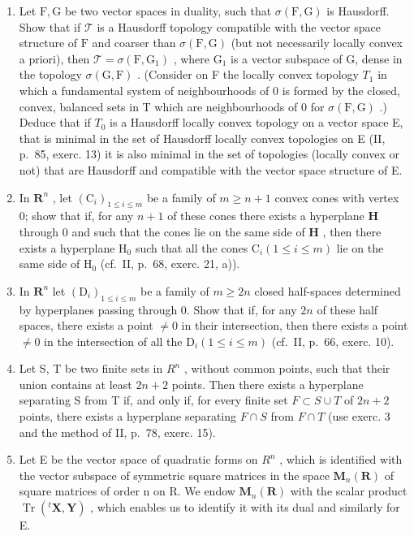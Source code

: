 \exercisegroup

\begin{enumerate}
\def\labelenumi{\arabic{enumi})}
\item
  Let \(\mathrm{F}, \mathrm{G}\) be two vector spaces in duality, such that \(\sigma(\mathrm{F}, \mathrm{G})\) is Hausdorff. Show that if \(\mathcal{T}\) is a Hausdorff topology compatible with the vector space structure of \(\mathrm{F}\) and coarser than \(\sigma(\mathrm{F}, \mathrm{G})\) (but not necessarily locally convex a priori), then \(\mathcal{T} = \sigma(\mathrm{F}, \mathrm{G}_1)\) , where \(\mathrm{G}_1\) is a vector subspace of G, dense in the topology \(\sigma(\mathrm{G},\mathrm{F})\) . (Consider on F the locally convex topology \(T_{1}\) in which a fundamental system of neighbourhoods of 0 is formed by the closed, convex, balanced sets in T which are neighbourhoods of 0 for \(\sigma(\mathrm{F},\mathrm{G})\) .) Deduce that if \(T_{0}\) is a Hausdorff locally convex topology on a vector space E, that is minimal in the set of Hausdorff locally convex topologies on E (II, p.~85, exerc. 13) it is also minimal in the set of topologies (locally convex or not) that are Hausdorff and compatible with the vector space structure of E.
\item
  In \(\mathbf{R}^n\) , let \((\mathrm{C}_i)_{1\leqslant i\leqslant m}\) be a family of \(m\geqslant n + 1\) convex cones with vertex 0; show that if, for any \(n + 1\) of these cones there exists a hyperplane \(\mathbf{H}\) through 0 and such that the cones lie on the same side of \(\mathbf{H}\) , then there exists a hyperplane \(\mathrm{H}_0\) such that all the cones \(\mathrm{C}_i(1\leqslant i\leqslant m)\) lie on the same side of \(\mathrm{H}_0\) (cf.~II, p.~68, exerc. 21, a)).
\item
  In \(\mathbf{R}^n\) let \((\mathrm{D}_i)_{1\leqslant i\leqslant m}\) be a family of \(m\geqslant 2n\) closed half-spaces determined by hyperplanes passing through 0. Show that if, for any \(2n\) of these half spaces, there exists a point \(\neq 0\) in their intersection, then there exists a point \(\neq 0\) in the intersection of all the \(\mathrm{D}_i(1\leqslant i\leqslant m)\) (cf.~II, p.~66, exerc. 10).
\item
  Let S, T be two finite sets in \(R^{n}\) , without common points, such that their union contains at least \(2n + 2\) points. Then there exists a hyperplane separating S from T if, and only if, for every finite set \(F \subset S \cup T\) of \(2n + 2\) points, there exists a hyperplane separating \(F \cap S\) from \(F \cap T\) (use exerc. 3 and the method of II, p.~78, exerc. 15).
\item
  Let E be the vector space of quadratic forms on \(R^{n}\) , which is identified with the vector subspace of symmetric square matrices in the space \(\mathbf{M}_{n}(\mathbf{R})\) of square matrices of order n on R. We endow \(\mathbf{M}_{n}(\mathbf{R})\) with the scalar product \(\operatorname{Tr}(^{t}\mathbf{X},\mathbf{Y})\) , which enables us to identify it with its dual and similarly for E.
\end{enumerate}

